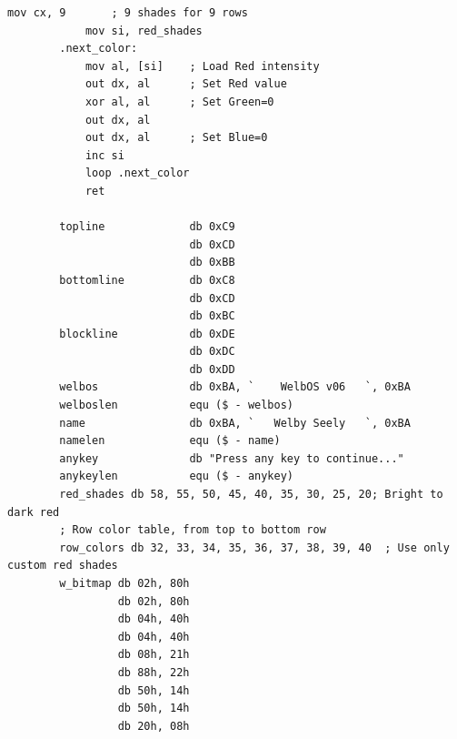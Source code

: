 \documentclass{article}
\begin{document}
\begin{lstlisting}[caption={loaderV06.asm listing}, captionpos=t]
            mov cx, 9       ; 9 shades for 9 rows
            mov si, red_shades
        .next_color:
            mov al, [si]    ; Load Red intensity
            out dx, al      ; Set Red value
            xor al, al      ; Set Green=0
            out dx, al
            out dx, al      ; Set Blue=0
            inc si
            loop .next_color
            ret

        topline             db 0xC9
                            db 0xCD
                            db 0xBB
        bottomline          db 0xC8
                            db 0xCD
                            db 0xBC
        blockline           db 0xDE
                            db 0xDC
                            db 0xDD
        welbos              db 0xBA, `    WelbOS v06   `, 0xBA
        welboslen           equ ($ - welbos)
        name                db 0xBA, `   Welby Seely   `, 0xBA
        namelen             equ ($ - name)
        anykey              db "Press any key to continue..."
        anykeylen           equ ($ - anykey)
        red_shades db 58, 55, 50, 45, 40, 35, 30, 25, 20; Bright to dark red
        ; Row color table, from top to bottom row
        row_colors db 32, 33, 34, 35, 36, 37, 38, 39, 40  ; Use only custom red shades
        w_bitmap db 02h, 80h
                 db 02h, 80h
                 db 04h, 40h
                 db 04h, 40h
                 db 08h, 21h
                 db 88h, 22h
                 db 50h, 14h
                 db 50h, 14h
                 db 20h, 08h
    \end{lstlisting}
\end{document}
